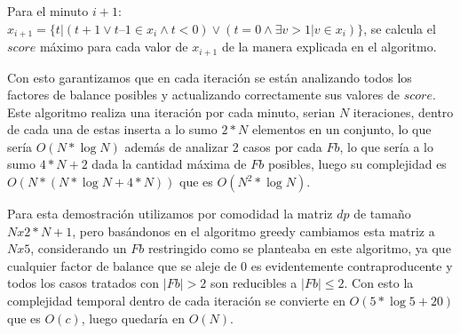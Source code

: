\documentclass[12pt,a4paper]{report}
\begin{document}
Para el minuto $i+1$: $x_{i+1} = \{t | (t + 1 \lor t – 1 \in x_i \land t < 0) \lor (t = 0 \land \exists v > 1 | v \in x_i)\}$, se calcula el $score$ máximo para cada valor de $x_{i+1}$ de la manera explicada en el algoritmo.

\bigskip

Con esto garantizamos que en cada iteración se están analizando todos los factores de balance posibles y actualizando correctamente sus valores de $score$. Este algoritmo realiza una iteración por cada minuto, serian $N$ iteraciones, dentro de cada una de estas inserta a lo sumo $2*N$ elementos en un conjunto, lo que sería $O(N*\log{N})$ además de analizar 2 casos por cada $Fb$, lo que sería a lo sumo $4*N + 2$ dada la cantidad máxima de $Fb$ posibles, luego su complejidad es $O(N*(N*\log{N} + 4*N))$ que es $O(N^{2}*\log{N})$.

Para esta demostración utilizamos por comodidad la matriz $dp$ de tamaño $Nx2*N +1$, pero basándonos en el algoritmo greedy cambiamos esta matriz a $N x 5$, considerando un $Fb$ restringido como se planteaba en este algoritmo, ya que cualquier factor de balance que se aleje de 0 es evidentemente contraproducente y todos los casos tratados con $|Fb| > 2$ son reducibles a $|Fb| \leq 2$. Con esto la complejidad temporal dentro de cada iteración se convierte en $O(5*\log{5} + 20)$ que es $O(c)$, luego quedaría en $O(N)$. 
\end{document}
